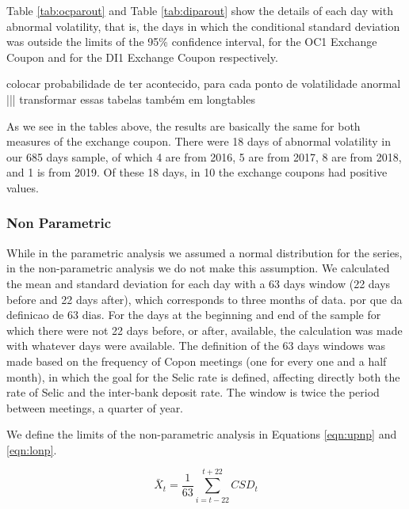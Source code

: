 \documentclass[cic,tc, english]{iiufrgs}
\begin{document}
    

    

    

    Table \ref{tab:ocparout} and Table \ref{tab:diparout} show the details of each day with abnormal volatility, that is, the days in which the conditional standard deviation was outside the limits of the 95\% confidence interval, for the OC1 Exchange Coupon and for the DI1 Exchange Coupon respectively.

    

    

    {colocar probabilidade de ter acontecido, para cada ponto de volatilidade anormal ||| transformar essas tabelas também em longtables}

    As we see in the tables above, the results are basically the same for both measures of the exchange coupon. There were 18 days of abnormal volatility in our 685 days sample, of which 4 are from 2016, 5 are from 2017, 8 are from 2018, and 1 is from 2019. Of these 18 days, in 10 the exchange coupons had positive values.


\subsubsection{Non Parametric}

    While in the parametric analysis we assumed a normal distribution for the series, in the non-parametric analysis we do not make this assumption. We calculated the mean and standard deviation for each day with a 63 days window (22 days before and 22 days after), which corresponds to three months of data. {por que da definicao de 63 dias}. For the days at the beginning and end of the sample for which there were not 22 days before, or after, available, the calculation was made with whatever days were available. The definition of the 63 days windows was made based on the frequency of Copon meetings (one for every one and a half month), in which the goal for the Selic rate is defined, affecting directly both the rate of Selic and the inter-bank deposit rate. The window is twice the period between meetings, a quarter of year.

    We define the limits of the non-parametric analysis in Equations \ref{eqn:upnp} and \ref{eqn:lonp}.

    $$\bar{X}_t = \frac{1}{63} \displaystyle\sum_{i=t-22}^{t+22} CSD_t$$
\end{document}
